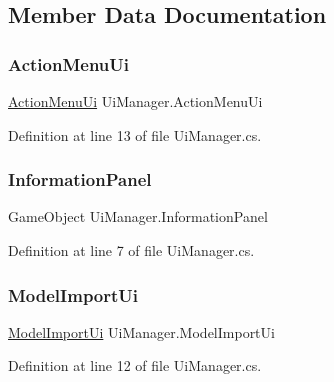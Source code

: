 \subsection{Member Data Documentation}
\mbox{\label{class_ui_manager_a3afdba4b0bc234226776a09b30347b37}} 
\subsubsection{\texorpdfstring{ActionMenuUi}{ActionMenuUi}}
{\footnotesize\ttfamily \mbox{\hyperlink{class_action_menu_ui}{Action\+Menu\+Ui}} Ui\+Manager.\+Action\+Menu\+Ui}



Definition at line 13 of file Ui\+Manager.\+cs.

\mbox{\label{class_ui_manager_adcd30c5a43465bae39f7dde94cbb5c11}} 
\subsubsection{\texorpdfstring{InformationPanel}{InformationPanel}}
{\footnotesize\ttfamily Game\+Object Ui\+Manager.\+Information\+Panel}



Definition at line 7 of file Ui\+Manager.\+cs.

\mbox{\label{class_ui_manager_a2bb024cf54acc9d7aae98b2260a10471}} 
\subsubsection{\texorpdfstring{ModelImportUi}{ModelImportUi}}
{\footnotesize\ttfamily \mbox{\hyperlink{class_model_import_ui}{Model\+Import\+Ui}} Ui\+Manager.\+Model\+Import\+Ui}



Definition at line 12 of file Ui\+Manager.\+cs.

\mbox{\label{class_ui_manager_a3bfed40246705bc1cb9d1611200e5064}} 
